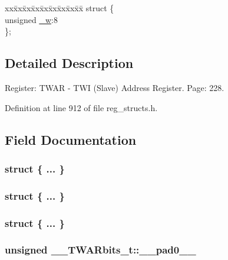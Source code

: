 \begin{DoxyCompactItemize}
\begin{tabbing}
\end{tabbing}\item 
\begin{tabbing}
xx\=xx\=xx\=xx\=xx\=xx\=xx\=xx\=xx\=\kill
struct \{\\
\>unsigned \hyperlink{union_____t_w_a_rbits__t_a39ec7154eb77d712384d4f10d58489c8}{\_w}:8\\
\}; \\

\end{tabbing}\end{DoxyCompactItemize}


\subsection{Detailed Description}
Register\+: T\+W\+A\+R -\/ T\+W\+I (Slave) Address Register. Page\+: 228. 

Definition at line 912 of file reg\+\_\+structs.\+h.



\subsection{Field Documentation}
\hypertarget{union_____t_w_a_rbits__t_a1f91789142869f9b3ed9f4b1c117cc47}{\subsubsection[{"@223}]{\setlength{\rightskip}{0pt plus 5cm}struct \{ ... \} }}\label{union_____t_w_a_rbits__t_a1f91789142869f9b3ed9f4b1c117cc47}
\hypertarget{union_____t_w_a_rbits__t_a5aa31dcbe5dbd6e1b8b8edf19b3e9a32}{\subsubsection[{"@225}]{\setlength{\rightskip}{0pt plus 5cm}struct \{ ... \} }}\label{union_____t_w_a_rbits__t_a5aa31dcbe5dbd6e1b8b8edf19b3e9a32}
\hypertarget{union_____t_w_a_rbits__t_a4bd59b862d7110e39da535c362ed59a5}{\subsubsection[{"@227}]{\setlength{\rightskip}{0pt plus 5cm}struct \{ ... \} }}\label{union_____t_w_a_rbits__t_a4bd59b862d7110e39da535c362ed59a5}
\hypertarget{union_____t_w_a_rbits__t_a191540c737be70afad53dfd5e1b41457}{
\subsubsection[{\+\_\+\+\_\+pad0\+\_\+\+\_\+}]{\setlength{\rightskip}{0pt plus 5cm}unsigned \+\_\+\+\_\+\+T\+W\+A\+Rbits\+\_\+t\+::\+\_\+\+\_\+pad0\+\_\+\+\_\+}}\label{union_____t_w_a_rbits__t_a191540c737be70afad53dfd5e1b41457}



